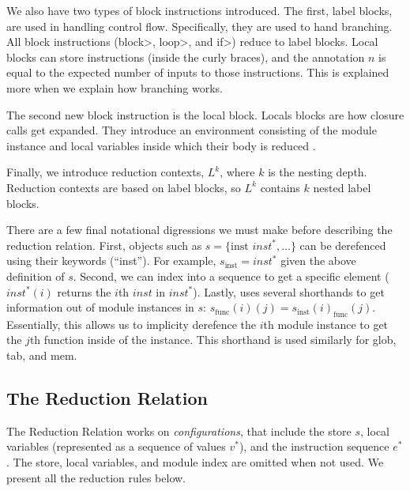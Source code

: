 We also have two types of block instructions introduced.
The first, label blocks, are used in handling control flow.
Specifically, they are used to hand branching.
All block instructions (\<block>, \<loop>, and \<if>) reduce to label blocks.
Local blocks can store instructions (inside the curly braces), and the annotation $n$ is equal to the expected number of inputs to those instructions.
This is explained more when we explain how branching works.

The second new block instruction is the local block.
Locals blocks are how closure calls get expanded.
They introduce an environment consisting of the module instance and local variables inside which their body is reduced .

Finally, we introduce reduction contexts, $L^{k}$, where $k$ is the nesting depth.
Reduction contexts are based on label blocks, so $L^{k}$ contains $k$ nested label blocks.

There are a few final notational digressions we must make before describing the reduction relation.
First, objects such as $s=\{\text{inst } inst^{*}, \dots \}$ can be derefenced using their keywords (\eg ``inst'').
For example, $s_\text{inst}=inst^{*}$ given the above definition of $s$.
Second, we can index into a sequence to get a specific element (\eg $inst^{*}(i)$ returns the $i$th $inst$ in $inst^{*}$).
Lastly, \wasm uses several shorthands to get information out of module instances in $s$: $s_\text{func}(i)(j)=s_\text{inst}(i)_\text{func}(j)$.
Essentially, this allows us to implicity derefence the $i$th module instance to get the $j$th function inside of the instance.
This shorthand is used similarly for glob, tab, and mem.

\subsection{The \wasm Reduction Relation}
The \wasm Reduction Relation works on \emph{configurations}, that include the store $s$, local variables (represented as a sequence of values $v^{*}$), and the instruction sequence $e^{*}$.
The store, local variables, and module index are omitted when not used.
We present all the reduction rules below.

\begin{mathpar}
\end{mathpar}

